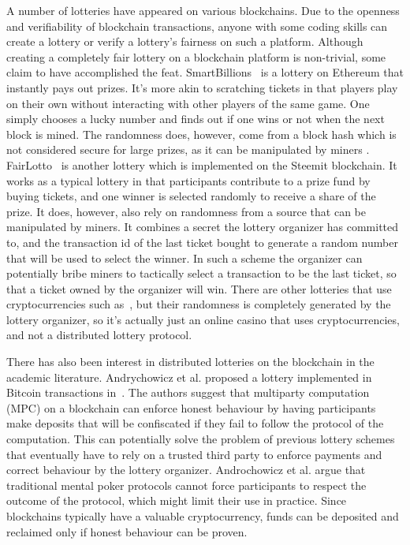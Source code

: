 A number of lotteries have appeared on various blockchains. Due to the openness and verifiability of blockchain transactions, anyone with some coding skills can create a lottery or verify a lottery's fairness on such a platform. Although creating a completely fair lottery on a blockchain platform is non-trivial, some claim to have accomplished the feat. SmartBillions~\cite{noauthor_smartbillions_nodate} is a lottery on Ethereum that instantly pays out prizes. It's more akin to scratching tickets in that players play on their own without interacting with other players of the same game. One simply chooses a lucky number and finds out if one wins or not when the next block is mined. The randomness does, however, come from a block hash which is not considered secure for large prizes, as it can be manipulated by miners \cite{bonneau_bitcoin_2015, pierrot_malleability_2018}. 
FairLotto~\cite{ago_fairlotto_2018} is another lottery which is implemented on the Steemit blockchain. It works as a typical lottery in that participants contribute to a prize fund by buying tickets, and one winner is selected randomly to receive a share of the prize. It does, however, also rely on randomness from a source that can be manipulated by miners. It combines a secret the lottery organizer has committed to, and the transaction id of the last ticket bought to generate a random number that will be used to select the winner. In such a scheme the organizer can potentially bribe miners to tactically select a transaction to be the last ticket, so that a ticket owned by the organizer will win. 
There are other lotteries that use cryptocurrencies such as~\cite{noauthor_satoshi_nodate}, but their randomness is completely generated by the lottery organizer, so it's actually just an online casino that uses cryptocurrencies, and not a distributed lottery protocol.

There has also been interest in distributed lotteries on the blockchain in the academic literature. Andrychowicz et al. proposed a lottery implemented in Bitcoin transactions in~\cite{andrychowicz_secure_2014}. The authors suggest that multiparty computation (MPC) on a blockchain can enforce honest behaviour by having participants make deposits that will be confiscated if they fail to follow the protocol of the computation. This can potentially solve the problem of previous lottery schemes that eventually have to rely on a trusted third party to enforce payments and correct behaviour by the lottery organizer. Androchowicz et al. argue that traditional mental poker protocols cannot force participants to respect the outcome of the protocol, which might limit their use in practice. Since blockchains typically have a valuable cryptocurrency, funds can be deposited and reclaimed only if honest behaviour can be proven.

